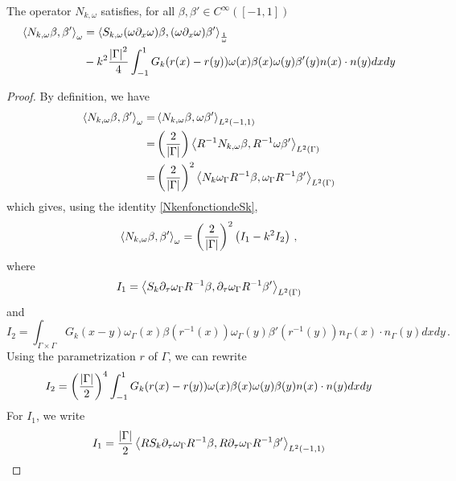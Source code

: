 \documentclass[a4paper]{article}
\begin{document}
\begin{Lem}
	The operator $N_{k,\omega}$ satisfies, for all $\beta, \beta' \in C^\infty([-1,1])$
	\[\begin{split}
		\left\langle N_{k,\omega} \beta,\beta'\right\rangle_\omega& = \left\langle S_{k,\omega}(\omega \partial_x \omega)\beta,(\omega \partial_x \omega) \beta'\right\rangle_\frac{1}{\omega}\\
		&-k^2 \frac{\left\lvert \Gamma \right\rvert^2}{4}\int_{-1}^{1} G_k(r(x) - r(y))\omega(x)\beta(x)\omega(y)\beta'(y) n(x) \cdot n(y) dx dy
	\end{split}\]
\end{Lem}
\begin{proof}
	By definition, we have
	\begin{equation*}
	\label{NkomegaenfonctiondeSkomega}
	\begin{split}
	\left\langle N_{k,\omega} \beta,\beta'\right\rangle_\omega = 
	&\left\langle N_{k,\omega} \beta,\omega \beta'\right\rangle_{L^2(-1,1)}\\
	=&\left(\frac{2}{\left\lvert \Gamma \right\rvert}\right)\left\langle R^{-1}N_{k,\omega} \beta,R^{-1}\omega \beta'\right\rangle_{L^2(\Gamma)}\\
	= &\left(\frac{2}{\left\lvert \Gamma \right\rvert}\right)^2\left\langle N_{k}\omega_\Gamma R^{-1} \beta,\omega_\Gamma R^{-1}\beta'\right\rangle_{L^2(\Gamma)}
	\end{split}
	\end{equation*}
	which gives, using the identity \eqref{NkenfonctiondeSk},
	\begin{equation}
		\left\langle N_{k,\omega} \beta,\beta'\right\rangle_\omega =\left(\frac{2}{\left\lvert \Gamma \right\rvert}\right)^2 \left(I_1 -k^2 I_2\right)\,,
		\label{ident_step1}
	\end{equation}
	where 
	\[I_1=\left\langle S_{k}\partial_\tau\omega_\Gamma R^{-1} \beta,\partial_\tau\omega_\Gamma R^{-1}\beta'\right\rangle_{L^2(\Gamma)}\]
	and 
	\[I_2 = \int_{\Gamma \times \Gamma}G_k(x - y) \omega_\Gamma(x) \beta(r^{-1}(x))\omega_\Gamma(y)\beta'(r^{-1}(y)) n_\Gamma(x)\cdot n_\Gamma(y) dxdy\,.\]
	Using the parametrization $r$ of $\Gamma$, we can rewrite
	\begin{equation}
		I_2 = \left(\frac{\left\lvert \Gamma \right\rvert}{2}\right)^4\int_{-1}^{1} G_k(r(x)-r(y)) \omega(x)\beta(x) \omega(y)\beta(y)n(x) \cdot n(y)dxdy
		\label{ident_step2}
	\end{equation}
	For $I_1$, we write 
	\begin{equation*}
		\begin{split}
		I_1=\frac{\abs{\Gamma}}{2}\duality{RS_{k}\partial_\tau\omega_\Gamma R^{-1} \beta}{R\partial_\tau\omega_\Gamma R^{-1}\beta'}_{L^2(-1,1)}
		\end{split}

\end{equation*}
\end{proof}
\end{document}
